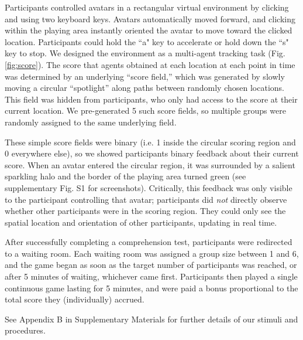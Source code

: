 \documentclass[12pt,letterpaper]{article}
\begin{document}
Participants controlled avatars in a rectangular virtual environment by clicking and using two keyboard keys. 
Avatars automatically moved forward, and clicking within the playing area instantly oriented the avatar to move toward the clicked location. 
Participants could hold the ``a" key to accelerate or hold down the ``s" key to stop.  
We designed the environment as a multi-agent tracking task (Fig. \ref{fig:score}).
The score that agents obtained at each location at each point in time was determined by an underlying ``score field,'' which was generated by slowly moving a circular ``spotlight'' along paths between randomly chosen locations.
This field was hidden from participants, who only had access to the score at their current location. 
We pre-generated 5 such score fields, so multiple groups were randomly assigned to the same underlying field.  

These simple score fields were binary (i.e. 1 inside the circular scoring region and 0 everywhere else), so we showed participants binary feedback about their current score.
When an avatar entered the circular region, it was surrounded by a salient sparkling halo and the border of the playing area turned green (see supplementary Fig. S1 for screenshots). 
Critically, this feedback was only visible to the participant controlling that avatar; participants did \emph{not} directly observe whether other participants were in the scoring region. 
They could only see the spatial location and orientation of other participants, updating in real time.

After successfully completing a comprehension test, participants were redirected to a waiting room.
Each waiting room was assigned a group size between 1 and 6, and the game began as soon as the target number of participants was reached, or after 5 minutes of waiting, whichever came first.
Participants then played a single continuous game lasting for 5 minutes, and were paid a bonus proportional to the total score they (individually) accrued.

See Appendix B in Supplementary Materials for further details of our stimuli and procedures.
\end{document}
